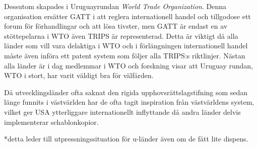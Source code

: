 Dessutom skapades i Uruguayrundan \emph{World Trade Organization}. Denna organisation ersätter GATT i att reglera internationell handel och tillgodose ett forum för förhandlingar och att lösa tivster, men GATT är endast en av stöttepelarna i WTO även TRIPS är representerad. Detta är viktigt då alla länder som vill vara delaktiga i WTO och i förlängningen internationell handel måste även införa ett patent system som följer alla TRIPS:s riktlinjer. Nästan alla länder är i dag medlemmar i WTO och forskning visar att Uruguay rundan, WTO i stort, har varit väldigt bra för välfärden\cite{harrison}. 

Då utvecklingsländer ofta saknat den rigida upphovsrättslagstifning som sedan länge funnits i västvärlden har de ofta tagit inspiration från västvärldens system\cite{finger}, vilket ger USA ytterliggare internationellt inflyttande då andra länder delvis implementerar schablonkopior.

*detta leder till utpressningssituation för u-länder även om de fått lite dispens.